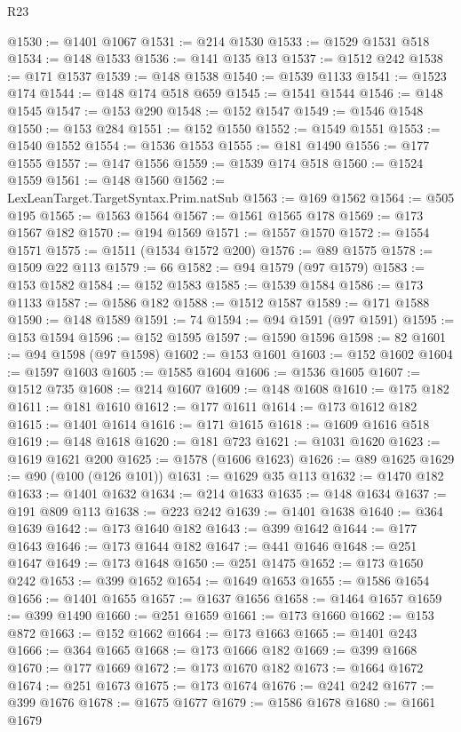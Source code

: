 \begin{lexlean}{R23}
\begin{coremodule}
@1530 := @1401 @1067
@1531 := @214 @1530
@1533 := @1529 @1531 @518
@1534 := @148 @1533
@1536 := @141 @135 @13
@1537 := @1512 @242
@1538 := @171 @1537
@1539 := @148 @1538
@1540 := @1539 @1133
@1541 := @1523 @174
@1544 := @148 @174 @518 @659
@1545 := @1541 @1544
@1546 := @148 @1545
@1547 := @153 @290
@1548 := @152 @1547
@1549 := @1546 @1548
@1550 := @153 @284
@1551 := @152 @1550
@1552 := @1549 @1551
@1553 := @1540 @1552
@1554 := @1536 @1553
@1555 := @181 @1490
@1556 := @177 @1555
@1557 := @147 @1556
@1559 := @1539 @174 @518
@1560 := @1524 @1559
@1561 := @148 @1560
@1562 := LexLeanTarget.TargetSyntax.Prim.natSub
@1563 := @169 @1562
@1564 := @505 @195
@1565 := @1563 @1564
@1567 := @1561 @1565 @178
@1569 := @173 @1567 @182
@1570 := @194 @1569
@1571 := @1557 @1570
@1572 := @1554 @1571
@1575 := @1511 (@1534 @1572 @200)
@1576 := @89 @1575
@1578 := @1509 @22 @113
@1579 := 66
@1582 := @94 @1579 (@97 @1579)
@1583 := @153 @1582
@1584 := @152 @1583
@1585 := @1539 @1584
@1586 := @173 @1133
@1587 := @1586 @182
@1588 := @1512 @1587
@1589 := @171 @1588
@1590 := @148 @1589
@1591 := 74
@1594 := @94 @1591 (@97 @1591)
@1595 := @153 @1594
@1596 := @152 @1595
@1597 := @1590 @1596
@1598 := 82
@1601 := @94 @1598 (@97 @1598)
@1602 := @153 @1601
@1603 := @152 @1602
@1604 := @1597 @1603
@1605 := @1585 @1604
@1606 := @1536 @1605
@1607 := @1512 @735
@1608 := @214 @1607
@1609 := @148 @1608
@1610 := @175 @182
@1611 := @181 @1610
@1612 := @177 @1611
@1614 := @173 @1612 @182
@1615 := @1401 @1614
@1616 := @171 @1615
@1618 := @1609 @1616 @518
@1619 := @148 @1618
@1620 := @181 @723
@1621 := @1031 @1620
@1623 := @1619 @1621 @200
@1625 := @1578 (@1606 @1623)
@1626 := @89 @1625
@1629 := @90 (@100 (@126 @101))
@1631 := @1629 @35 @113
@1632 := @1470 @182
@1633 := @1401 @1632
@1634 := @214 @1633
@1635 := @148 @1634
@1637 := @191 @809 @113
@1638 := @223 @242
@1639 := @1401 @1638
@1640 := @364 @1639
@1642 := @173 @1640 @182
@1643 := @399 @1642
@1644 := @177 @1643
@1646 := @173 @1644 @182
@1647 := @441 @1646
@1648 := @251 @1647
@1649 := @173 @1648
@1650 := @251 @1475
@1652 := @173 @1650 @242
@1653 := @399 @1652
@1654 := @1649 @1653
@1655 := @1586 @1654
@1656 := @1401 @1655
@1657 := @1637 @1656
@1658 := @1464 @1657
@1659 := @399 @1490
@1660 := @251 @1659
@1661 := @173 @1660
@1662 := @153 @872
@1663 := @152 @1662
@1664 := @173 @1663
@1665 := @1401 @243
@1666 := @364 @1665
@1668 := @173 @1666 @182
@1669 := @399 @1668
@1670 := @177 @1669
@1672 := @173 @1670 @182
@1673 := @1664 @1672
@1674 := @251 @1673
@1675 := @173 @1674
@1676 := @241 @242
@1677 := @399 @1676
@1678 := @1675 @1677
@1679 := @1586 @1678
@1680 := @1661 @1679

\end{coremodule}
\end{lexlean}
